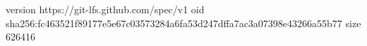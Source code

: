 version https://git-lfs.github.com/spec/v1
oid sha256:fc463521f89177e5e67c03573284a6fa53d247dffa7ac3a07398e43266a55b77
size 626416
